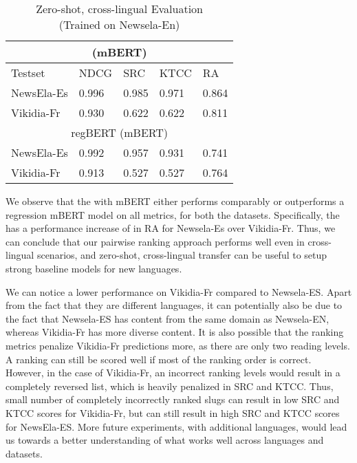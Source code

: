 \documentclass[11pt]{article}
\begin{document}
\begin{table}[htb]
\begin{tabular}{ |p{2.45cm}|p{0.85cm}|p{0.7cm}|p{0.8cm}| p{0.7cm}|}
 \hline 
 \multicolumn{5}{|c|}{(mBERT)} \\ \hline
 Testset & NDCG & SRC &KTCC & RA\\
 \hline
 NewsEla-Es& 0.996 & 0.985 & 0.971 & 0.864\\ 
 \hline
 Vikidia-Fr& 0.930 & 0.622 & 0.622 & 0.811\\
 \hline
  \multicolumn{5}{|c|}{regBERT (mBERT)} \\ \hline
  NewsEla-Es & 0.992 & 0.957 & 0.931 & 0.741\\
 \hline
 Vikidia-Fr& 0.913 & 0.527 & 0.527 & 0.764\\
 \hline
\end{tabular}
\caption{Zero-shot, cross-lingual Evaluation \\ (Trained on Newsela-En)}
\label{tab:rankingcrossling}
\end{table}


We observe that the  with mBERT either performs comparably or outperforms a regression mBERT model on all metrics, for both the datasets. Specifically, the  has a performance increase of  in RA for Newsela-Es over Vikidia-Fr. Thus, we can conclude that our pairwise ranking approach performs well even in cross-lingual scenarios, and zero-shot, cross-lingual transfer can be useful to setup strong baseline models for new languages. 

We can notice a lower performance on Vikidia-Fr compared to Newsela-ES. Apart from the fact that they are different languages, it can potentially also be due to the fact that Newsela-ES has content from the same domain as Newsela-EN, whereas Vikidia-Fr has more diverse content.  It is also possible that the ranking metrics penalize Vikidia-Fr predictions more, as there are only two reading levels. A ranking can still be scored well if most of the ranking order is correct. However, in the case of Vikidia-Fr, an incorrect ranking levels would result in a completely reversed list, which is heavily penalized in SRC and KTCC.  Thus, small number of completely incorrectly ranked slugs can result in low SRC and KTCC scores for Vikidia-Fr, but can still result in high SRC and KTCC scores for NewsEla-ES. More future experiments, with additional languages, would lead us towards a better understanding of what works well across languages and datasets. 
\end{document}
